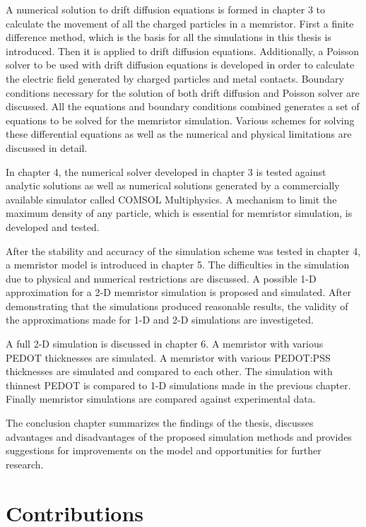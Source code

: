 \begin{doublespace}
A numerical solution to drift diffusion equations is formed in chapter 3 to calculate the movement of all the charged particles in a memristor. First a finite difference method, which is the basis for all the simulations in this thesis is introduced. Then it is applied to drift diffusion equations. Additionally, a Poisson solver to be used with drift diffusion equations is developed in order to calculate the electric field generated by charged particles and metal contacts. Boundary conditions necessary for the solution of both drift diffusion and Poisson solver are discussed. All the equations and boundary conditions combined generates a set of equations to be solved for the memristor simulation. Various schemes for solving these differential equations as well as the numerical and physical limitations are discussed in detail.
 
In chapter 4, the numerical solver developed in chapter 3 is tested against analytic solutions as well as numerical solutions generated by a commercially available simulator called COMSOL Multiphysics. A mechanism to limit the maximum density of any particle, which is essential for memristor simulation, is developed and tested. 

After the stability and accuracy of the simulation scheme was tested in chapter 4, a memristor model is introduced in chapter 5. The difficulties in the simulation due to physical and numerical restrictions are discussed. A possible 1-D approximation for a 2-D memristor simulation is proposed and simulated. After demonstrating that the simulations produced reasonable results, the validity of the approximations made for 1-D and 2-D simulations are investigeted.  

A full 2-D simulation is discussed in chapter 6. A memristor with various PEDOT thicknesses are simulated. A memristor with various PEDOT:PSS thicknesses are simulated and compared to each other. The simulation with thinnest PEDOT is compared to 1-D simulations made in the previous chapter. Finally memristor simulations are compared against experimental data.

The conclusion chapter summarizes the findings of the thesis, discusses advantages and disadvantages of the proposed simulation methods and provides suggestions for improvements on the model and opportunities for further research.

\section{Contributions}



\end{doublespace}
